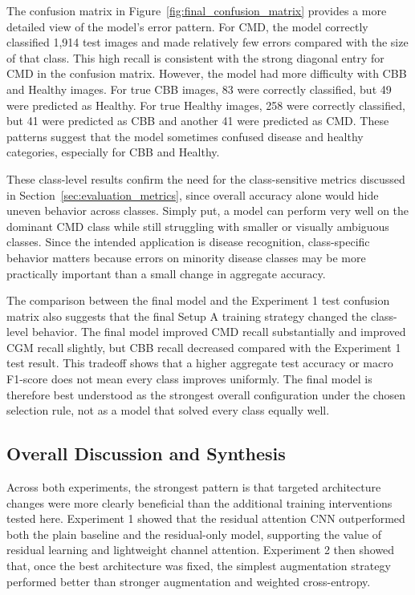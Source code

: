 \documentclass[11pt]{article}
\begin{document}
The confusion matrix in Figure~\ref{fig:final_confusion_matrix} provides a more detailed view of the model's error pattern. For CMD, the model correctly classified 1,914 test images and made relatively few errors compared with the size of that class. This high recall is consistent with the strong diagonal entry for CMD in the confusion matrix. However, the model had more difficulty with CBB and Healthy images. For true CBB images, 83 were correctly classified, but 49 were predicted as Healthy. For true Healthy images, 258 were correctly classified, but 41 were predicted as CBB and another 41 were predicted as CMD. These patterns suggest that the model sometimes confused disease and healthy categories, especially for CBB and Healthy.

These class-level results confirm the need for the class-sensitive metrics discussed in Section~\ref{sec:evaluation_metrics}, since overall accuracy alone would hide uneven behavior across classes. Simply put, a model can perform very well on the dominant CMD class while still struggling with smaller or visually ambiguous classes. Since the intended application is disease recognition, class-specific behavior matters because errors on minority disease classes may be more practically important than a small change in aggregate accuracy.

The comparison between the final model and the Experiment 1 test confusion matrix also suggests that the final Setup A training strategy changed the class-level behavior. The final model improved CMD recall substantially and improved CGM recall slightly, but CBB recall decreased compared with the Experiment 1 test result. This tradeoff shows that a higher aggregate test accuracy or macro F1-score does not mean every class improves uniformly. The final model is therefore best understood as the strongest overall configuration under the chosen selection rule, not as a model that solved every class equally well.

\subsection{Overall Discussion and Synthesis}

Across both experiments, the strongest pattern is that targeted architecture changes were more clearly beneficial than the additional training interventions tested here. Experiment 1 showed that the residual attention CNN outperformed both the plain baseline and the residual-only model, supporting the value of residual learning and lightweight channel attention. Experiment 2 then showed that, once the best architecture was fixed, the simplest augmentation strategy performed better than stronger augmentation and weighted cross-entropy.
\end{document}

